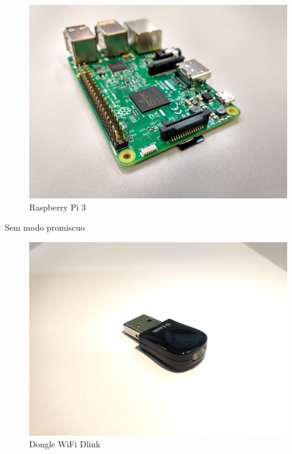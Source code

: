 \begin{figure}[htb]
	\caption{\label{fig:modulos-esp}Raspberry Pi 3}
	\begin{center}
		\includegraphics[width=1\textwidth]{040-plataformas/RPi-WiFi-dongles/rpi-onboard.jpg}
	\end{center}
\end{figure}


Sem modo promiscuo

\begin{figure}[htb]
	\caption{\label{fig:modulos-esp}Dongle WiFi Dlink}
	\begin{center}
		\includegraphics[width=1\textwidth]{040-plataformas/RPi-WiFi-dongles/dlink.jpg}
	\end{center}
\end{figure}


